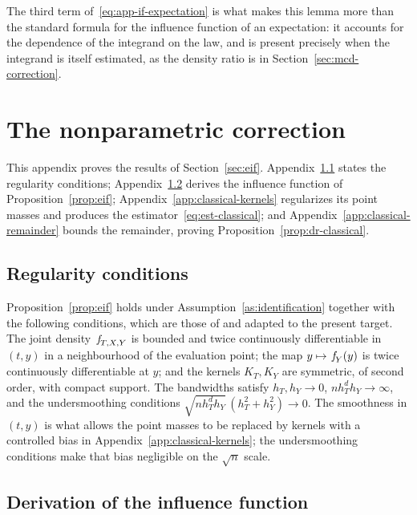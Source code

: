 \documentclass[11pt]{article}
\theoremstyle{plain}
\theoremstyle{definition}
\theoremstyle{remark}
\newcommand{\pf}[1]{\ensuremath{\,\mathlarger{\textit{f}}_{#1}}}
\begin{document}
The third term of~\eqref{eq:app-if-expectation} is what makes this lemma more than the standard
formula for the influence function of an expectation: it accounts for the dependence of the
integrand on the law, and is present precisely when the integrand is itself estimated, as the
density ratio is in Section~\ref{sec:mcd-correction}.

\section{The nonparametric correction}
\label{app:classical}

This appendix proves the results of Section~\ref{sec:eif}. Appendix~\ref{app:classical-regularity}
states the regularity conditions; Appendix~\ref{app:classical-derivative} derives the influence
function of Proposition~\ref{prop:eif}; Appendix~\ref{app:classical-kernels} regularizes its
point masses and produces the estimator~\eqref{eq:est-classical}; and
Appendix~\ref{app:classical-remainder} bounds the remainder, proving
Proposition~\ref{prop:dr-classical}.

\subsection{Regularity conditions}
\label{app:classical-regularity}

Proposition~\ref{prop:eif} holds under Assumption~\ref{as:identification} together with the
following conditions, which are those of \citet{kennedy2017continuous} and
\citet{kennedy2023density} adapted to the present target. The joint density $\pf{T,X,Y}$ is
bounded and twice continuously differentiable in $(t,y)$ in a neighbourhood of the evaluation
point; the map $y \mapsto \pf{Y}(y)$ is twice continuously differentiable at $y$; and the
kernels $K_T,K_Y$ are symmetric, of second order, with compact support. The bandwidths satisfy
$h_T,h_Y \to 0$, $n h_T^{d} h_Y \to \infty$, and the undersmoothing conditions
$\sqrt{n h_T^d h_Y}\,(h_T^2 + h_Y^2) \to 0$. The smoothness in $(t,y)$ is what allows the point
masses to be replaced by kernels with a controlled bias in
Appendix~\ref{app:classical-kernels}; the undersmoothing conditions make that bias negligible
on the $\sqrt n$ scale.

\subsection{Derivation of the influence function}
\label{app:classical-derivative}
\end{document}
